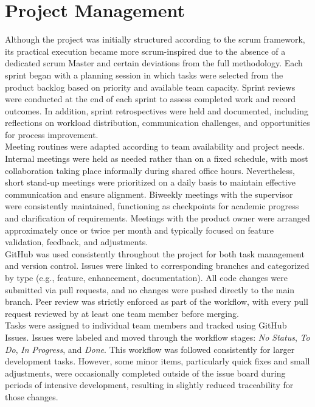 \section{Project Management}
\label{sec:results-project-management}
Although the project was initially structured according to the \gls{scrum} framework, its practical execution became more \gls{scrum}-inspired due to the absence of a dedicated \gls{scrum} Master and certain deviations from the full methodology. Each sprint began with a planning session in which tasks were selected from the product backlog based on priority and available team capacity. Sprint reviews were conducted at the end of each sprint to assess completed work and record outcomes. In addition, sprint retrospectives were held and documented, including reflections on workload distribution, communication challenges, and opportunities for process improvement. \\

Meeting routines were adapted according to team availability and project needs. Internal meetings were held as needed rather than on a fixed schedule, with most collaboration taking place informally during shared office hours. Nevertheless, short stand-up meetings were prioritized on a daily basis to maintain effective communication and ensure alignment. Biweekly meetings with the supervisor were consistently maintained, functioning as checkpoints for academic progress and clarification of requirements. Meetings with the product owner were arranged approximately once or twice per month and typically focused on feature validation, feedback, and adjustments. \\

GitHub was used consistently throughout the project for both task management and version control. Issues were linked to corresponding branches and categorized by type (e.g., feature, enhancement, documentation). All code changes were submitted via pull requests, and no changes were pushed directly to the main branch. Peer review was strictly enforced as part of the workflow, with every pull request reviewed by at least one team member before merging. \\

Tasks were assigned to individual team members and tracked using GitHub Issues. Issues were labeled and moved through the workflow stages: \textit{No Status}, \textit{To Do}, \textit{In Progress}, and \textit{Done}. This workflow was followed consistently for larger development tasks. However, some minor items, particularly quick fixes and small adjustments, were occasionally completed outside of the issue board during periods of intensive development, resulting in slightly reduced traceability for those changes.\\

